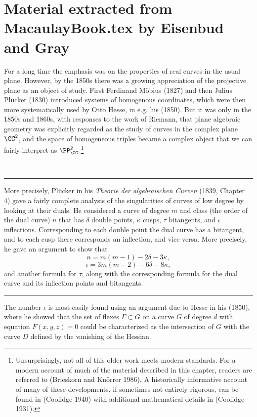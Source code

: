  
 
 \chapter{Material extracted from MacaulayBook.tex by Eisenbud and Gray}
 
 For a long time the emphasis was on the properties of real curves in the usual plane. However, by the 1850s there was a growing appreciation of the projective plane as an object of study. First Ferdinand M\"obius (1827) and then Julius Pl\"ucker (1830) introduced systems of homogenous coordinates, which were then more systematically used by Otto Hesse, in e.g. his (1850). But it was only in the 1850s and 1860s, with responses to the work of Riemann, that plane algebraic geometry was explicitly  regarded as  the study of curves in the complex plane $\CC^2$, and the space of homogeneous triples  became a complex object that we can fairly interpret as $\PP_{\CC}^2.$\footnote{Unsurprisingly, not all of this older work meets modern standards. For a modern account of  much of the material described in this chapter, readers are referred to (Brieskorn and Kn\"orrer 1986). A historically informative account of many of these developments, if sometimes not entirely rigorous, can be found in (Coolidge 1940) with additional mathematical details in (Coolidge 1931).}

\
\bigbreak\hrule\bigbreak

More precisely, Pl\"ucker in his \emph{Theorie der algebraischen Curven} (1839, Chapter 4) gave a fairly complete analysis of the singularities of curves of low degree by looking at their duals. He considered a curve of degree $m$ and class (the order of the dual curve) $n$ that has $\delta$ double points, $\kappa$ cusps, $\tau$ bitangents, and $\iota$ inflections. Corresponding to each double point the dual curve has a bitangent, and to each cusp there corresponds an inflection, and vice versa. More precisely, he gave an argument to show that
\[n = m(m-1) - 2\delta - 3 \kappa,\]
\[\iota = 3m(m-2) - 6\delta - 8\kappa,\]
and another formula for $\tau$, along with the corresponding formula for the dual curve and its inflection points and bitangents.

\bigbreak\hrule\bigbreak


The number $\iota$ is most easily found using an argument due to Hesse in his (1850), where he showed that the set of flexes $\Gamma \subset G$ on a curve $G$ of degree $d$ with equation $F(x,y,z) = 0$ could be characterized as the intersection of $G$ with the curve $D$ defined by the vanishing of the Hessian.

